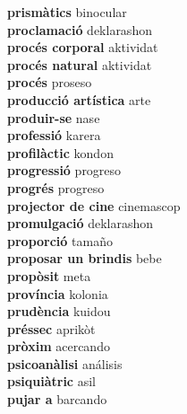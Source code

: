 \textbf{ prismàtics  } binocular \\
\textbf{ proclamació  } deklarashon \\
\textbf{ procés corporal  } aktividat \\
\textbf{ procés natural  } aktividat \\
\textbf{ procés  } proseso \\
\textbf{ producció artística  } arte \\
\textbf{ produir-se  } nase \\
\textbf{ professió  } karera \\
\textbf{ profilàctic  } kondon \\
\textbf{ progressió  } progreso \\
\textbf{ progrés  } progreso \\
\textbf{ projector de cine  } cinemascop \\
\textbf{ promulgació  } deklarashon \\
\textbf{ proporció  } tamaño \\
\textbf{ proposar un brindis  } bebe \\
\textbf{ propòsit  } meta \\
\textbf{ província  } kolonia \\
\textbf{ prudència  } kuidou \\
\textbf{ préssec  } aprikòt \\
\textbf{ pròxim  } acercando \\
\textbf{ psicoanàlisi  } análisis \\
\textbf{ psiquiàtric  } asil \\
\textbf{ pujar a  } barcando \\
